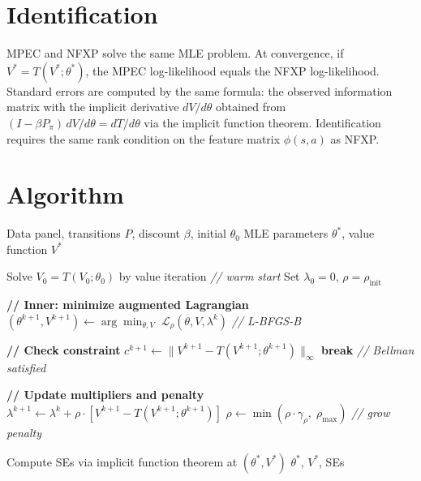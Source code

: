 \documentclass[11pt]{article}
\begin{document}
\section{Identification}

MPEC and NFXP solve the same MLE problem.
At convergence, if $V^* = T(V^*;\theta^*)$, the MPEC log-likelihood equals the NFXP log-likelihood.
Standard errors are computed by the same formula: the observed information matrix with the implicit derivative $dV/d\theta$ obtained from $(I - \beta P_\pi) \, dV/d\theta = dT/d\theta$ via the implicit function theorem.
Identification requires the same rank condition on the feature matrix $\phi(s,a)$ as NFXP.

\section{Algorithm}

\begin{algorithm}[h!]
\caption{MPEC via Augmented Lagrangian (Su \& Judd 2012)}
\label{alg:mpec}
\begin{algorithmic}[1]
\REQUIRE Data panel, transitions $P$, discount $\beta$, initial $\theta_0$
\ENSURE MLE parameters $\theta^*$, value function $V^*$

\STATE Solve $V_0 = T(V_0; \theta_0)$ by value iteration \hfill \textit{// warm start}
\STATE Set $\lambda_0 = 0$, $\rho = \rho_{\text{init}}$


\STATE \textbf{// Inner: minimize augmented Lagrangian}
\STATE $(\theta^{k+1}, V^{k+1}) \leftarrow \arg\min_{\theta, V} \; \mathcal{L}_\rho(\theta, V, \lambda^k)$ \hfill \textit{// L-BFGS-B}

\STATE \textbf{// Check constraint}
\STATE $c^{k+1} \leftarrow \|V^{k+1} - T(V^{k+1}; \theta^{k+1})\|_\infty$
  \STATE \textbf{break} \hfill \textit{// Bellman satisfied}
\ENDIF

\STATE \textbf{// Update multipliers and penalty}
\STATE $\lambda^{k+1} \leftarrow \lambda^k + \rho \cdot [V^{k+1} - T(V^{k+1}; \theta^{k+1})]$
\STATE $\rho \leftarrow \min(\rho \cdot \gamma_\rho, \; \rho_{\max})$ \hfill \textit{// grow penalty}

\ENDFOR

\STATE Compute SEs via implicit function theorem at $(\theta^*, V^*)$
\RETURN $\theta^*$, $V^*$, SEs
\end{algorithmic}
\end{algorithm}
\FloatBarrier
\end{document}
